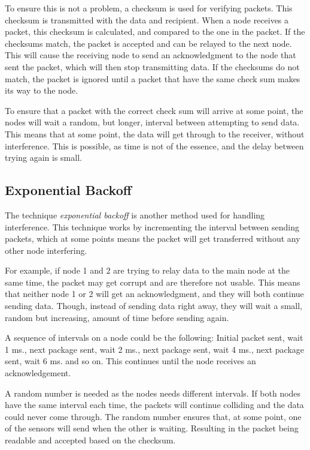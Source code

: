 To ensure this is not a problem, a checksum is used for verifying packets. This checksum is transmitted with the data and recipient. When a node receives a packet, this checksum is calculated, and compared to the one in the packet. If the checksums match, the packet is accepted and can be relayed to the next node. This will cause the receiving node to send an acknowledgment to the node that sent the packet, which will then stop transmitting data.
If the checksums do not match, the packet is ignored until a packet that have the same check sum makes its way to the node.

To ensure that a packet with the correct check sum will arrive at some point, the nodes will wait a random, but longer, interval between attempting to send data. This means that at some point, the data will get through to the receiver, without interference.
This is possible, as time is not of the essence, and the delay between trying again is small.

\subsection*{Exponential Backoff}\label{cha:expbackoff}
The technique \textit{exponential backoff} is another method used for handling interference. This technique works by incrementing the interval between sending packets, which at some points means the packet will get transferred without any other node interfering. 

For example, if node 1 and 2 are trying to relay data to the main node at the same time, the packet may get corrupt and are therefore not usable. This means that neither node 1 or 2 will get an acknowledgment, and they will both continue sending data. Though, instead of sending data right away, they will wait a small, random but increasing, amount of time before sending again.

A sequence of intervals on a node could be the following: Initial packet sent, wait 1 ms., next package sent, wait 2 ms.,  next package sent, wait 4 ms., next package sent, wait 6 ms. and so on. This continues until the node receives an acknowledgement.

A random number is needed as the nodes needs different intervals. If both nodes have the same interval each time, the packets will continue colliding and the data could never come through. The random number ensures that, at some point, one of the sensors will send when the other is waiting. Resulting in the packet being readable and accepted based on the checksum.

